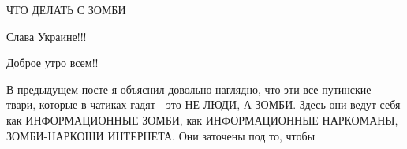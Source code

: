 







ЧТО ДЕЛАТЬ С ЗОМБИ

Слава Украине!!! 💛 💙 💛 💙 💛 💙

Доброе утро всем!!

В предыдущем посте я объяснил довольно наглядно, что эти все путинские твари,
которые в чатиках гадят - это НЕ ЛЮДИ, А ЗОМБИ. Здесь они ведут себя как
ИНФОРМАЦИОННЫЕ ЗОМБИ, как ИНФОРМАЦИОННЫЕ НАРКОМАНЫ, ЗОМБИ-НАРКОШИ ИНТЕРНЕТА.
Они заточены под то, чтобы

